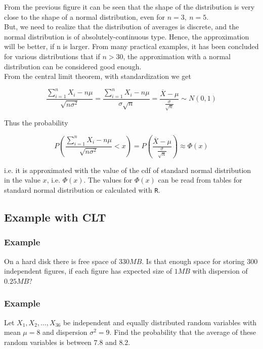 \documentclass[a4paper, 12pt]{article}
\begin{document}
From the previous figure it can be seen that the shape of the distribution is very close to the shape of a normal distribution, even for $n = 3,\ n = 5$.\\

But, we need to realize that the distribution of averages is discrete, and the normal
distribution is of absolutely-continuous type. Hence, the approximation will be better, if n is larger. From many practical examples, it has been concluded for various distributions that if $n > 30$, the approximation with a normal distribution can be considered good enough.\\

From the central limit theorem, with standardization we get

\[ \frac{\sum_{i=1}^{n} X_i - n\mu }{\sqrt{n\sigma^2}} = \frac{\sum_{i=1}^{n} X_i - n\mu }{\sigma \sqrt{n}} = \frac{\overline{X} - \mu}{\frac{\sigma}{\sqrt{n}}} \sim N(0,1) \]

Thus the probability

\[  P\left( \frac{\sum_{i=1}^{n} X_i - n\mu }{\sqrt{n\sigma^2}} < x \right) 
= P\left( \frac{\overline{X} - \mu}{\frac{\sigma}{\sqrt{n}}}  \right) \approx \Phi(x) \]


i.e. it is approximated with the value of the cdf of standard normal distribution in the value $x$, i.e. $\Phi(x)$. The values for $\Phi(x)$ can be read from tables for standard normal distribution or calculated with \texttt{R}.


\subsection{Example with CLT}

\subsubsection{Example}

On a hard disk there is free space of $330MB$. Is that enough space for storing $300$ independent figures, if each figure has expected size of $1MB$ with dispersion of $0.25MB$?

\subsubsection{Example}

Let $X_1, X_2, \dots ,X_{36}$ be independent and equally distributed random
variables with mean $\mu = 8$ and dispersion $\sigma^2 = 9$. Find the probability that the average of these random variables is between $7.8$ and $8.2$.
\end{document}
